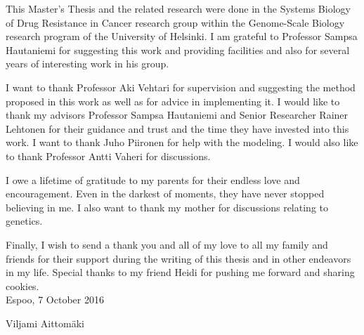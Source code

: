 \documentclass[english,12pt,a4paper,pdftex,elec,utf8]{aaltothesis}
\begin{document}

\newpage


This Master's Thesis and the related research were done in the Systems Biology
of Drug Resistance in Cancer research group within the Genome-Scale Biology
research program of the University of Helsinki. I am grateful to Professor
Sampsa Hautaniemi for suggesting this work and providing facilities and also
for several years of interesting work in his group.

I want to thank Professor Aki Vehtari for supervision and suggesting the
method proposed in this work as well as for advice in implementing it. I would
like to thank my advisors Professor Sampsa Hautaniemi and Senior Researcher
Rainer Lehtonen for their guidance and trust and the time they have invested
into this work. I want to thank Juho Piironen for help with the modeling. I
would also like to thank Professor Antti Vaheri for discussions.

I owe a lifetime of gratitude to my parents for their endless love and
encouragement. Even in the darkest of moments, they have never stopped
believing in me. I also want to thank my mother for discussions relating
to genetics.

Finally, I wish to send a thank you and all of my love to all my family and
friends for their support during the writing of this thesis and in other
endeavors in my life. Special thanks to my friend Heidi for pushing me forward
and sharing cookies. \\

\vspace{5cm}
Espoo, 7 October 2016

\vspace{5mm}
{\hfill Viljami Aittom\"aki \hspace{1cm}}


\newpage


\thesistableofcontents













\end{document}
